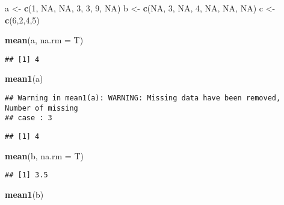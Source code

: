 \documentclass[
]{article}
\newenvironment{Shaded}{\begin{snugshade}}{\end{snugshade}}
\newcommand{\DataTypeTok}[1]{\textcolor[rgb]{0.13,0.29,0.53}{#1}}
\newcommand{\DecValTok}[1]{\textcolor[rgb]{0.00,0.00,0.81}{#1}}
\newcommand{\KeywordTok}[1]{\textcolor[rgb]{0.13,0.29,0.53}{\textbf{#1}}}
\newcommand{\NormalTok}[1]{#1}
\newcommand{\OtherTok}[1]{\textcolor[rgb]{0.56,0.35,0.01}{#1}}
\newcommand{\StringTok}[1]{\textcolor[rgb]{0.31,0.60,0.02}{#1}}
\begin{document}
\begin{Shaded}
\begin{Highlighting}[]
\NormalTok{a <-}\StringTok{ }\KeywordTok{c}\NormalTok{(}\DecValTok{1}\NormalTok{, }\OtherTok{NA}\NormalTok{, }\OtherTok{NA}\NormalTok{, }\DecValTok{3}\NormalTok{, }\DecValTok{3}\NormalTok{, }\DecValTok{9}\NormalTok{, }\OtherTok{NA}\NormalTok{)}
\NormalTok{b <-}\StringTok{ }\KeywordTok{c}\NormalTok{(}\OtherTok{NA}\NormalTok{, }\DecValTok{3}\NormalTok{, }\OtherTok{NA}\NormalTok{, }\DecValTok{4}\NormalTok{, }\OtherTok{NA}\NormalTok{, }\OtherTok{NA}\NormalTok{, }\OtherTok{NA}\NormalTok{)}
\NormalTok{c <-}\StringTok{ }\KeywordTok{c}\NormalTok{(}\DecValTok{6}\NormalTok{,}\DecValTok{2}\NormalTok{,}\DecValTok{4}\NormalTok{,}\DecValTok{5}\NormalTok{)}

\KeywordTok{mean}\NormalTok{(a, }\DataTypeTok{na.rm =}\NormalTok{ T)}
\end{Highlighting}
\end{Shaded}

\begin{verbatim}
## [1] 4
\end{verbatim}

\begin{Shaded}
\begin{Highlighting}[]
\KeywordTok{mean1}\NormalTok{(a)}
\end{Highlighting}
\end{Shaded}

\begin{verbatim}
## Warning in mean1(a): WARNING: Missing data have been removed, Number of missing
## case : 3
\end{verbatim}

\begin{verbatim}
## [1] 4
\end{verbatim}

\begin{Shaded}
\begin{Highlighting}[]
\KeywordTok{mean}\NormalTok{(b, }\DataTypeTok{na.rm =}\NormalTok{ T)}
\end{Highlighting}
\end{Shaded}

\begin{verbatim}
## [1] 3.5
\end{verbatim}

\begin{Shaded}
\begin{Highlighting}[]
\KeywordTok{mean1}\NormalTok{(b)}
\end{Highlighting}
\end{Shaded}
\end{document}
